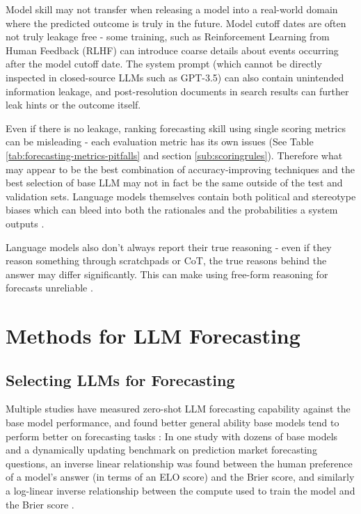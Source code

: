 \documentclass[12pt,a4paper]{article}
\begin{document}
Model skill may not transfer when releasing a model into a real-world domain where the predicted outcome is truly in the future. Model cutoff dates are often not truly leakage free - some training, such as Reinforcement Learning from Human Feedback (RLHF) can introduce coarse details about events occurring after the model cutoff date. The system prompt (which cannot be directly inspected in closed-source LLMs such as GPT-3.5) can also contain unintended information leakage, and post-resolution documents in search results can further leak hints or the outcome itself.

Even if there is no leakage, ranking forecasting skill using single scoring metrics can be misleading - each evaluation metric has its own issues  (See Table \ref{tab:forecasting-metrics-pitfalls} and section \ref{sub:scoringrules}). Therefore what may appear to be the best combination of accuracy-improving techniques and the best selection of base LLM may not in fact be the same outside of the test and validation sets.  Language models themselves contain both political and stereotype biases which can bleed into both the rationales and the probabilities a system outputs  . 

Language models also don't always report their true reasoning  - even if they reason something through scratchpads or CoT, the true reasons behind the answer may differ significantly. This can make using free-form reasoning for forecasts unreliable . 


\clearpage
 \section{Methods for LLM Forecasting}
\subsection{Selecting LLMs for Forecasting \DOMAINCAPITALIZEDINTERVENTIONTWO}
Multiple studies have measured zero-shot LLM forecasting capability against the base model performance, and found better general ability base models tend to perform better on forecasting tasks  : In one study with dozens of base models and a dynamically updating benchmark on prediction market forecasting questions, an inverse linear relationship was found between the human preference of a model's answer (in terms of an ELO score) and the Brier score, and similarly a log-linear inverse relationship between the compute used to train the model and the Brier score .
\end{document}
